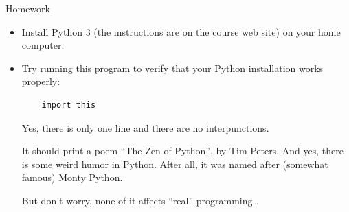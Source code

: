 \documentclass[xcolor=dvipsnames, 12pt]{beamer}
\newcommand{\MYTITLECOLOUR} {\textcolor[rgb]{1.,0.85,0.}}  %
\begin{document}
\begin{frame}[fragile]{\MYTITLECOLOUR{Homework}}
\begin{itemize}
  \item Install Python 3 (the instructions are on the course web site) on your home computer.
  \item Try running this program to verify that your Python installation works properly:
    \begin{lstlisting}
    import this
    \end{lstlisting}
    Yes, there is only one line and there are no interpunctions. \par
    It should print a poem ``The Zen of Python'', by Tim Peters.
    And yes, there is some weird humor in Python. After all, it was named after (somewhat famous) Monty Python. \par
    But don't worry, none of it affects ``real'' programming\dots
\end{itemize}
\end{frame}

\end{document}
